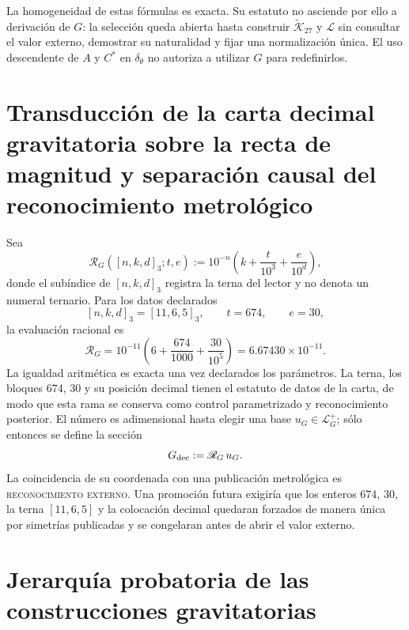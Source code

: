 La homogeneidad de estas fórmulas es exacta. Su estatuto no asciende por ello
a derivación de \(G\): la selección queda abierta hasta construir
\(\widetilde{\mathcal K}_{27}\) y \(\mathscr L\) sin consultar el valor
externo, demostrar su naturalidad y fijar una normalización única. El uso
descendente de \(A\) y \(C^\ast\) en \(\delta_\theta\) no autoriza a utilizar
\(G\) para redefinirlos.

\section{Transducción de la carta decimal gravitatoria sobre la recta de magnitud y separación causal del reconocimiento metrológico}
\label{sec:lector-decimal-independiente-G}

Sea
\[
 \mathscr R_G([n,k,d]_3;t,e)
 :=10^{-n}\left(k+\frac{t}{10^3}+\frac{e}{10^d}\right),
\]
donde el subíndice de \([n,k,d]_3\) registra la terna del lector y no denota
un numeral ternario. Para los datos declarados
\[
 [n,k,d]_3=[11,6,5]_3,\qquad t=674,\qquad e=30,
\]
la evaluación racional es
\[
 \boxed{
 \mathscr R_G
 =10^{-11}\left(6+\frac{674}{1000}+\frac{30}{10^5}\right)
 =6.67430\times10^{-11}.}
\]
La igualdad aritmética es exacta una vez declarados los parámetros. La terna,
los bloques \(674\), \(30\) y su posición decimal tienen el estatuto de datos
de la carta, de modo que esta rama se conserva como control parametrizado y
reconocimiento posterior. El número es adimensional hasta elegir una base
\(u_G\in\mathcal L_G^+\); sólo entonces se define la sección
\[
 G_{\rm dec}:=\mathscr R_G\,u_G.
\]
La coincidencia de su coordenada con una publicación metrológica es
\textsc{reconocimiento externo}. Una promoción futura exigiría que los enteros
\(674\), \(30\), la terna \([11,6,5]\) y la colocación decimal quedaran
forzados de manera única por simetrías publicadas y se congelaran antes de
abrir el valor externo.

\section{Jerarquía probatoria de las construcciones gravitatorias}
\label{sec:cuadrado-contraste-G}

